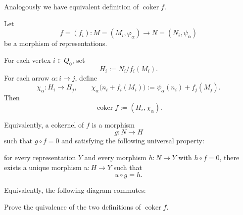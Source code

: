 \documentclass[11pt, a4paper]{report}
\begin{document}
Analogously we have equivalent definition of $ \operatorname{coker}f $.

\begin{definition}
    Let
    \[
    f=(f_i):M=(M_i,\varphi_\alpha)\to N=(N_i,\psi_\alpha)
    \]
    be a morphism of representations.
    
    For each vertex $i\in Q_0$, set
    \[
    H_i:=N_i/f_i(M_i).
    \]
    For each arrow $\alpha:i\to j$, define
    \[
    \chi_\alpha:H_i\to H_j,\qquad
    \chi_\alpha\bigl(n_i+f_i(M_i)\bigr)
    :=\psi_\alpha(n_i)+f_j(M_j).
    \]
    Then
    \[
    \operatorname{coker}f:=(H_i,\chi_\alpha).
    \]
    
    Equivalently, a cokernel of $f$ is a morphism
    \[
    g:N\to H
    \]
    such that $g\circ f=0$ and satisfying the following universal property:
    
    for every representation $Y$ and every morphism $h:N\to Y$ with $h\circ f=0$,
    there exists a unique morphism $u:H\to Y$ such that
    \[
    u\circ g=h.
    \]
    
    Equivalently, the following diagram commutes:
    \begin{center}
    \end{center}
    \end{definition}

\begin{exercise}
Prove the quivalence of the two definitions of $ \operatorname{coker}f $.
\end{exercise}
\end{document}
